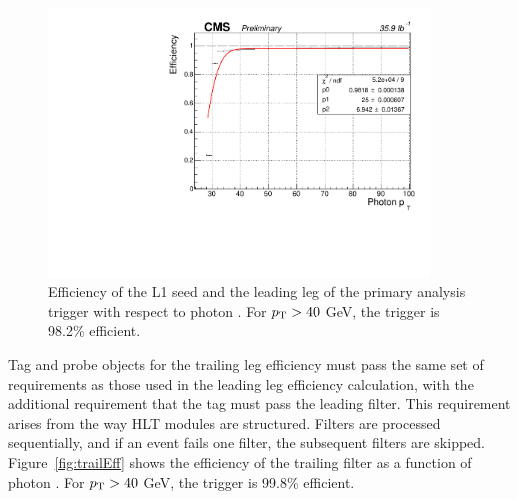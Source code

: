 \begin{figure}[h]
\begin{center}
\includegraphics[width=0.9\textwidth]{Figures/Trigger/leadingEff.pdf}
\end{center}
\caption[Efficiency of the L1 seed and the leading leg of the primary analysis trigger with respect to photon \pT. ]
{Efficiency of the L1 seed and the leading leg of the primary analysis trigger with respect to photon \pT. 
For $p_{\mathrm{T}} > 40$ GeV, the trigger is 98.2\% efficient.}
\label{fig:leadEff}
\end{figure}

Tag and probe objects for the trailing leg efficiency must pass the same set of requirements as those used in the leading leg efficiency calculation, with the additional requirement that the tag must pass the leading filter. This requirement arises from the way HLT modules are structured. Filters are processed sequentially, and if an event fails one filter, the subsequent filters are skipped. Figure~\ref{fig:trailEff} shows the efficiency of the trailing filter as a function of photon \pt. For $p_{\mathrm{T}} > 40$ GeV, the trigger is 99.8\% efficient.

